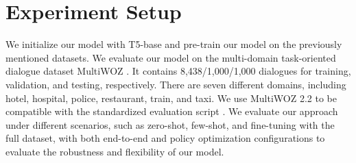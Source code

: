 \begin{table*}[t]
    \centering
    \caption{MultiWOZ Response generation evaluation. ``-'' means that this setting's performance is not reported. (Combined Score=(Inform + Success)*0.5 + BLEU)}
    \label{tab:full-fine-tune}
\end{table*}

\section{Experiment Setup}

We initialize our model with T5-base and pre-train our model on the previously mentioned datasets.
We evaluate our model on the multi-domain task-oriented dialogue dataset MultiWOZ \cite{DBLP:conf/emnlp/BudzianowskiWTC18}.
It contains 8,438/1,000/1,000 dialogues for training, validation, and testing, respectively.
There are seven different domains, including hotel, hospital, police, restaurant, train, and taxi.
We use MultiWOZ 2.2 \cite{zang-etal-2020-multiwoz} to be compatible with the standardized evaluation script \cite{DBLP:journals/corr/abs-2106-05555}. 
We evaluate our approach under different scenarios, such as zero-shot, few-shot, and fine-tuning with the full dataset, with both end-to-end and policy optimization configurations to evaluate the robustness and flexibility of our model.

